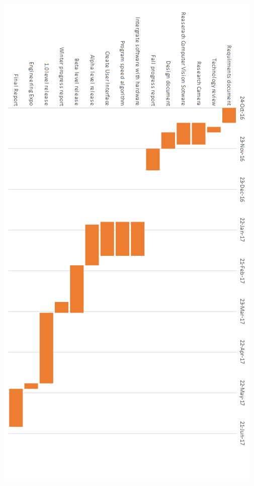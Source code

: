 \documentclass[onecolumn, draftclsnofoot,10pt, compsoc]{IEEEtran}
\begin{document}
\newpage

\includegraphics[scale=1]{gantt}
\end{document}
